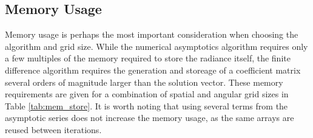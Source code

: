 
\subsection{Memory Usage}
Memory usage is perhaps the most important consideration when choosing the algorithm and grid size.
While the numerical asymptotics algorithm requires only a few multiples of the memory required to store the radiance itself, the finite difference algorithm requires the generation and storeage of a coefficient matrix several orders of magnitude larger than the solution vector.
These memory requirements are given for a combination of spatial and angular grid sizes in Table \ref{tab:mem_store}.
It is worth noting that using several terms from the asymptotic series does not increase the memory usage, as the same arrays are reused between iterations.

